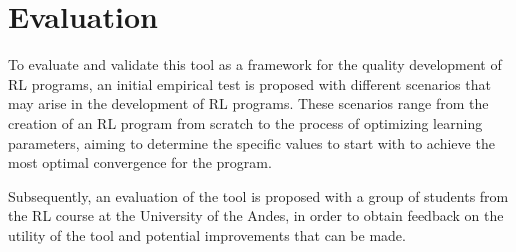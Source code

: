 
\chapter{Evaluation}
\label{cha:evaluation}

To evaluate and validate this tool as a framework for the quality development 
of RL programs, an initial empirical test is proposed with different scenarios 
that may arise in the development of RL programs. These scenarios range from 
the creation of an RL program from scratch to the process of optimizing 
learning parameters, aiming to determine the specific values to start with 
to achieve the most optimal convergence for the program.

Subsequently, an evaluation of the tool is proposed with a group of students 
from the RL course at the University of the Andes, in order to obtain 
feedback on the utility of the tool and potential improvements that can be made.

\endinput

